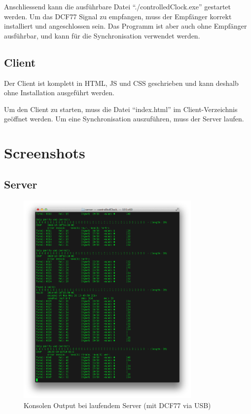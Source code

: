 Anschliessend kann die ausführbare Datei "`./controlledClock.exe"' gestartet werden. Um das DCF77 Signal zu empfangen, muss der Empfänger korrekt installiert und angeschlossen sein. Das Programm ist aber auch ohne Empfänger ausführbar, und kann für die Synchronisation verwendet werden.

\subsection{Client}
Der Client ist komplett in HTML, JS und CSS geschrieben und kann deshalb ohne Installation ausgeführt werden. 

Um den Client zu starten, muss die Datei "`index.html"' im Client-Verzeichnis geöffnet werden. Um eine Synchronisation auszuführen, muss der Server laufen.

\newpage
\section{Screenshots}

\subsection{Server}

\begin{figure}[htbp!]
	\caption{Konsolen Output bei laufendem Server (mit DCF77 via USB)}
	\centering
		\includegraphics[width=0.8\textwidth]{./images/screenshots/server_console_output.png}
\end{figure}

